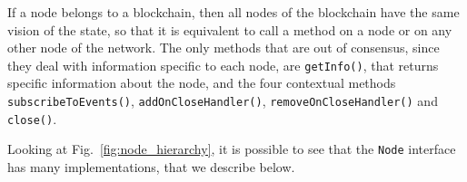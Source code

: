 If a node belongs to a blockchain, then all nodes of the blockchain have the same vision
of the state, so that it is equivalent to call a method on a node or on any other node of the
network. The only methods that are out of consensus, since they deal with information specific
to each node, are \texttt{getInfo()}, that returns
specific information about the node, and the four contextual methods
\texttt{subscribeToEvents()},
\texttt{addOnCloseHandler()},
\texttt{removeOnCloseHandler()}
and \texttt{close()}.

Looking at Fig.~\ref{fig:node_hierarchy}, it is possible to see that
the \texttt{Node} interface has many implementations, that we describe below.

